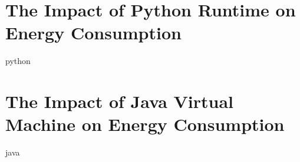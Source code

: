 \newpage
% 

\chapter{The Impact of Python Runtime on Energy Consumption}
\label{chapter:python}
{python}
\cleardoublepage
\chapter{The Impact of Java Virtual Machine on Energy Consumption}
\label{chapter:java}
{java}